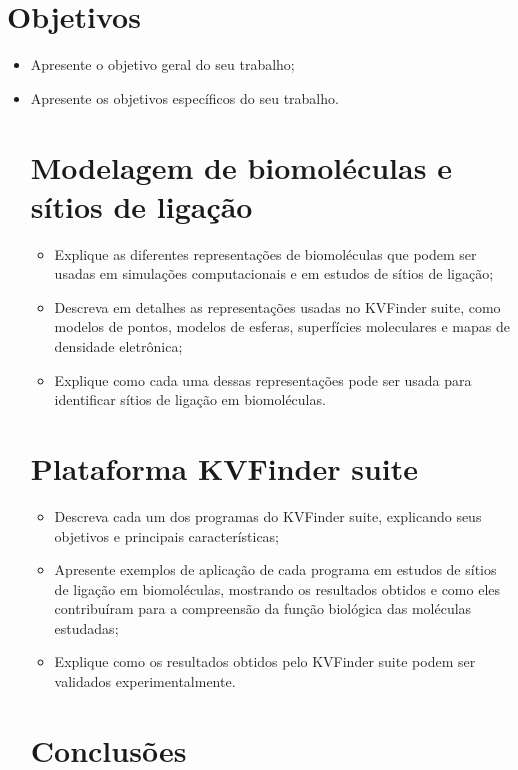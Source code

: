 \documentclass[Portugues]{phdquali}
\begin{document}
\chapter{Objetivos}

\begin{itemize}
 \item Apresente o objetivo geral do seu trabalho;
 \item Apresente os objetivos específicos do seu trabalho.

\chapter{Modelagem de biomoléculas e sítios de ligação}

\begin{itemize}
  \item Explique as diferentes representações de biomoléculas que podem ser usadas em simulações computacionais e em estudos de sítios de ligação;
  \item Descreva em detalhes as representações usadas no KVFinder suite, como modelos de pontos, modelos de esferas, superfícies moleculares e mapas de densidade eletrônica;
  \item Explique como cada uma dessas representações pode ser usada para identificar sítios de ligação em biomoléculas.
 \end{itemize}

\chapter{Plataforma KVFinder suite}

\begin{itemize}
  \item Descreva cada um dos programas do KVFinder suite, explicando seus objetivos e principais características;
  \item Apresente exemplos de aplicação de cada programa em estudos de sítios de ligação em biomoléculas, mostrando os resultados obtidos e como eles contribuíram para a compreensão da função biológica das moléculas estudadas;
  \item Explique como os resultados obtidos pelo KVFinder suite podem ser validados experimentalmente.
 \end{itemize}

\chapter{Conclusões}


\end{itemize}
\end{document}
